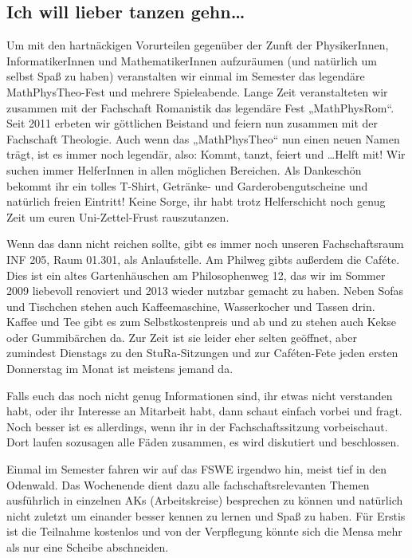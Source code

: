 \subsection{Ich will lieber tanzen gehn\dots}
Um mit den hartnäckigen Vorurteilen gegenüber der Zunft der PhysikerInnen, InformatikerInnen und MathematikerInnen aufzuräumen (und natürlich um selbst Spaß zu haben) veranstalten wir einmal im Semester das legendäre MathPhysTheo-Fest und mehrere Spieleabende. Lange Zeit veranstalteten wir zusammen mit der Fachschaft Romanistik das legendäre Fest „MathPhysRom“. Seit 2011 erbeten wir göttlichen Beistand und feiern nun zusammen mit der Fachschaft Theologie. Auch wenn das „MathPhysTheo“ nun einen neuen Namen trägt, ist es immer noch legendär, also: Kommt, tanzt, feiert und \dots Helft mit! Wir suchen immer HelferInnen in allen möglichen Bereichen. Als Dankeschön bekommt ihr ein tolles T-Shirt, Getränke- und Garderobengutscheine und natürlich freien Eintritt! Keine Sorge, ihr habt trotz Helferschicht noch genug Zeit um euren Uni-Zettel-Frust rauszutanzen.

Wenn das dann nicht reichen sollte, gibt es immer noch unseren Fachschaftsraum INF 205, Raum 01.301, als Anlaufstelle. Am Philweg gibts außerdem die Caféte. Dies ist ein altes Gartenhäuschen am Philosophenweg 12, das wir im Sommer 2009 liebevoll renoviert und 2013 wieder nutzbar gemacht zu haben. Neben Sofas und Tischchen stehen auch Kaffeemaschine, Wasserkocher und Tassen drin. Kaffee und Tee gibt es zum Selbstkostenpreis und ab und zu stehen auch Kekse oder Gummibärchen da. Zur Zeit ist sie leider eher selten geöffnet, aber zumindest Dienstags zu den \gls{StuRa}-Sitzungen und zur Caféten-Fete jeden ersten Donnerstag im Monat ist meistens jemand da.

Falls euch das noch nicht genug Informationen sind, ihr etwas nicht verstanden habt, oder ihr Interesse an Mitarbeit habt, dann schaut einfach vorbei und fragt. Noch besser ist es allerdings, wenn ihr in der Fachschaftssitzung vorbeischaut. Dort laufen sozusagen alle Fäden zusammen, es wird diskutiert und beschlossen.

Einmal im Semester fahren wir auf das \gls{FSWE} irgendwo hin, meist tief in den Odenwald. Das Wochenende dient dazu alle fachschaftsrelevanten Themen ausführlich in einzelnen AKs (Arbeitskreise) besprechen zu können und natürlich nicht zuletzt um einander besser kennen zu lernen und Spaß zu haben. Für Erstis ist die Teilnahme kostenlos und von der Verpflegung könnte sich die Mensa mehr als nur eine Scheibe abschneiden.
